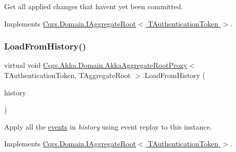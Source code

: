 Get all applied changes that haven\textquotesingle{}t yet been committed. 



Implements \hyperlink{interfaceCqrs_1_1Domain_1_1IAggregateRoot_a22fda414613f5ac0d4371554d7d6473b_a22fda414613f5ac0d4371554d7d6473b}{Cqrs.\+Domain.\+I\+Aggregate\+Root$<$ T\+Authentication\+Token $>$}.

\mbox{\label{classCqrs_1_1Akka_1_1Domain_1_1AkkaAggregateRootProxy_ae611077a51a215aef7fd0e106734b386_ae611077a51a215aef7fd0e106734b386}} 
\subsubsection{\texorpdfstring{Load\+From\+History()}{LoadFromHistory()}}
{\footnotesize\ttfamily virtual void \hyperlink{classCqrs_1_1Akka_1_1Domain_1_1AkkaAggregateRootProxy}{Cqrs.\+Akka.\+Domain.\+Akka\+Aggregate\+Root\+Proxy}$<$ T\+Authentication\+Token, T\+Aggregate\+Root $>$.Load\+From\+History (\begin{DoxyParamCaption}\item[{I\+Enumerable$<$ \hyperlink{interfaceCqrs_1_1Events_1_1IEvent}{I\+Event}$<$ T\+Authentication\+Token $>$$>$}]{history }\end{DoxyParamCaption})\hspace{0.3cm}{\ttfamily [virtual]}}



Apply all the \hyperlink{}{events} in {\itshape history}  using event replay to this instance. 



Implements \hyperlink{interfaceCqrs_1_1Domain_1_1IAggregateRoot_afe9329ee26ae68613059189ca64dfe60_afe9329ee26ae68613059189ca64dfe60}{Cqrs.\+Domain.\+I\+Aggregate\+Root$<$ T\+Authentication\+Token $>$}.

\mbox{\label{classCqrs_1_1Akka_1_1Domain_1_1AkkaAggregateRootProxy_aaa8a46fee21b6133ae4d1b2f60983d7e_aaa8a46fee21b6133ae4d1b2f60983d7e}} 

